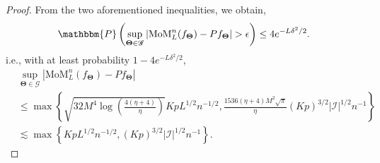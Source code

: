 \documentclass[11pt]{article}
\newcommand{\bTheta}{\boldsymbol{\Theta}}
\newcommand{\I}{\mathcal{I}}
\newcommand{\sP}{\mathbbm{P}}
\begin{document}
\begin{proof}
From the two aforementioned inequalities, we obtain, 
\[\sP\left( \sup_{\bTheta \in \mathscr{G}} |\text{MoM}^n_L (f_{\bTheta}) -Pf_{\bTheta} | > \epsilon \right) \le 4e^{-L \delta^2/2}.\]
i.e., with at least probability $1-4e^{-L \delta^2/2}$,
\begin{align*}
    & \sup_{\bTheta \in \mathscr{G}} |\text{MoM}^n_L (f_{\bTheta}) -Pf_{\bTheta} | \\
    &\le \max\left\{\sqrt{32  M^4 \log\left(\frac{4(\eta+4)}{\eta}\right)}KpL^{1/2}n^{-1/2}, \frac{1536(\eta+4)  M^2 \sqrt{\pi}}{\eta} (Kp)^{3/2} |\I|^{1/2}n^{-1}\right\}\\
    &\lesssim \max\left\{ KpL^{1/2}n^{-1/2}, (Kp)^{3/2}  |\I|^{1/2}n^{-1}\right\}.
\end{align*}
\end{proof}
\end{document}
